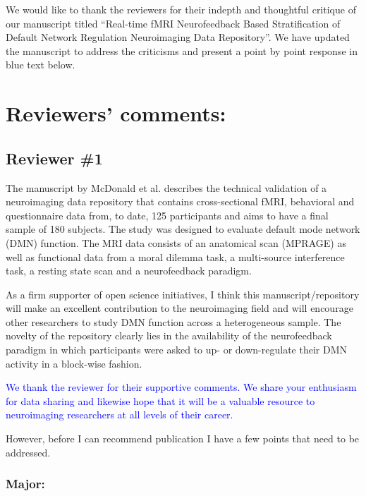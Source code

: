 \documentclass{article}
\newcommand{\RESPONSE}[1]{\textcolor{blue}{#1}}
\begin{document}
\sffamily

We would like to thank the reviewers for their indepth and thoughtful critique of our manuscript titled ``Real-time fMRI Neurofeedback Based Stratification of Default Network Regulation Neuroimaging Data Repository''. We have updated the manuscript to address the criticisms and present a point by point response in blue text below.

\section*{Reviewers' comments:}

\subsection*{Reviewer \#1} 

The manuscript by McDonald et al. describes the technical validation of a neuroimaging data repository that contains cross-sectional fMRI, behavioral and questionnaire data from, to date, 125 participants and aims to have a final sample of 180 subjects. The study was designed to evaluate default mode network (DMN) function. The MRI data consists of an anatomical scan (MPRAGE) as well as functional data from a moral dilemma task, a multi-source interference task, a resting state scan and a neurofeedback paradigm.

As a firm supporter of open science initiatives, I think this manuscript/repository will make an excellent contribution to the neuroimaging field and will encourage other researchers to study DMN function across a heterogeneous sample. The novelty of the repository clearly lies in the availability of the neurofeedback paradigm in which participants were asked to up- or down-regulate their DMN activity in a block-wise fashion.

\RESPONSE{We thank the reviewer for their supportive comments. We share your enthusiasm for data sharing and likewise hope that it will be a valuable resource to neuroimaging researchers at all levels of their career.}

However, before I can recommend publication I have a few points that need to be addressed.

\subsubsection*{Major:}
\end{document}
